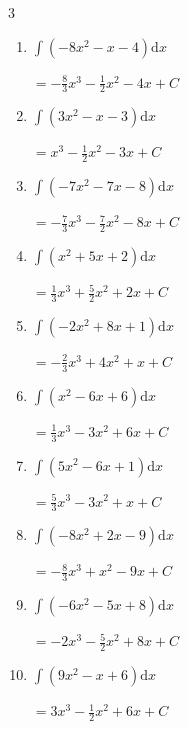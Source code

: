 \begin{multicols}{3}
\begin{enumerate}
        $\displaystyle =\frac{7}{3}x^{3}-\frac{5}{2}x^{2}-9x+ C$

  \item $\displaystyle \int \left( -8x^{2}-x-4 \right) \mathrm{d}x$

        $\displaystyle =-\frac{8}{3}x^{3}-\frac{1}{2}x^{2}-4x+ C$

  \item $\displaystyle \int \left( 3x^{2}-x-3 \right) \mathrm{d}x$

        $\displaystyle =x^{3}-\frac{1}{2}x^{2}-3x+ C$

  \item $\displaystyle \int \left( -7x^{2}-7x-8 \right) \mathrm{d}x$

        $\displaystyle =-\frac{7}{3}x^{3}-\frac{7}{2}x^{2}-8x+ C$

  \item $\displaystyle \int \left( x^{2}+5x+2 \right) \mathrm{d}x$

        $\displaystyle =\frac{1}{3}x^{3}+\frac{5}{2}x^{2}+2x+ C$

  \item $\displaystyle \int \left( -2x^{2}+8x+1 \right) \mathrm{d}x$

        $\displaystyle =-\frac{2}{3}x^{3}+4x^{2}+x+ C$

  \item $\displaystyle \int \left( x^{2}-6x+6 \right) \mathrm{d}x$

        $\displaystyle =\frac{1}{3}x^{3}-3x^{2}+6x+ C$

  \item $\displaystyle \int \left( 5x^{2}-6x+1 \right) \mathrm{d}x$

        $\displaystyle =\frac{5}{3}x^{3}-3x^{2}+x+ C$

  \item $\displaystyle \int \left( -8x^{2}+2x-9 \right) \mathrm{d}x$

        $\displaystyle =-\frac{8}{3}x^{3}+x^{2}-9x+ C$

\columnbreak %

  \item $\displaystyle \int \left( -6x^{2}-5x+8 \right) \mathrm{d}x$

        $\displaystyle =-2x^{3}-\frac{5}{2}x^{2}+8x+ C$

  \item $\displaystyle \int \left( 9x^{2}-x+6 \right) \mathrm{d}x$

        $\displaystyle =3x^{3}-\frac{1}{2}x^{2}+6x+ C$


\end{enumerate}
\end{multicols}
